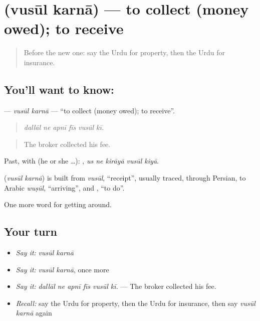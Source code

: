\section[\texorpdfstring{\ur{وصول} \ur{کرنا} (vusūl karnā)}{وصول کرنا (vusūl karnā)}]{  (vusūl karnā) — to collect (money owed); to receive}

\label{lesson:UR-C422-vusul-karna}



\begin{quote}
Before the new one: say the Urdu for property, then the Urdu for insurance.
\end{quote}

\subsection*{You'll want to know:  }
\textbf{ } — \emph{vusūl karnā} — \textquotedblleft{}to collect (money owed); to receive\textquotedblright{}.

\begin{quote}
     
\end{quote}

\begin{quote}
\emph{dallāl ne apnī fīs vusūl kī.}
\end{quote}

\begin{quote}
The broker collected his fee.
\end{quote}

Past, with  (he or she …):     , \emph{us ne kirāyā vusūl kiyā}.

\begin{cousinweb}
\textbf{ } (\emph{vusūl karnā}) is built from \emph{vusūl}, \textquotedblleft{}receipt\textquotedblright{}, usually traced, through Persian, to Arabic \emph{wuṣūl}, \textquotedblleft{}arriving\textquotedblright{}, and \textbf{}, \textquotedblleft{}to do\textquotedblright{}.
\end{cousinweb}

\begin{grammarlens}[title={What you've built}]
One more word for getting around.
\end{grammarlens}

\subsection*{Your turn}
\begin{itemize}
\raggedright
  \item \emph{Say it:} \emph{vusūl karnā}
  \item \emph{Say it:} \emph{vusūl karnā}, once more
  \item \emph{Say it:} \emph{dallāl ne apnī fīs vusūl kī.} — The broker collected his fee.
  \item \emph{Recall:} say the Urdu for property, then the Urdu for insurance, then say \emph{vusūl karnā} again
\end{itemize}

